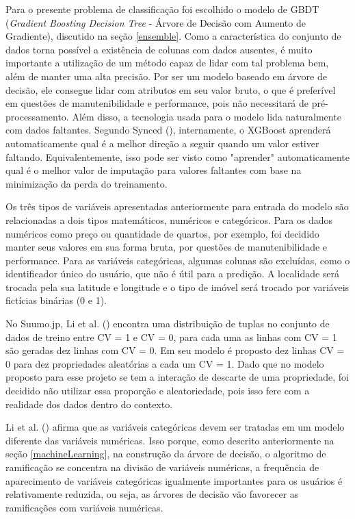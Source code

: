 Para o presente problema de classificação foi escolhido o modelo de GBDT (\textit{Gradient Boosting Decision Tree} - Árvore de Decisão com Aumento de Gradiente), discutido na seção \ref{ensemble}. Como a característica do conjunto de dados torna possível a existência de colunas com dados ausentes, é muito importante a utilização de um método capaz de lidar com tal problema bem, além de manter uma alta precisão. Por ser um modelo baseado em árvore de decisão, ele consegue lidar com atributos em seu valor bruto, o que é preferível em questões de manutenibilidade e performance, pois não necessitará de pré-processamento. Além disso, a tecnologia usada para o modelo lida naturalmente com dados faltantes. Segundo Synced (\citeyear{Synced:2017}), internamente, o XGBoost aprenderá automaticamente qual é a melhor direção a seguir quando um valor estiver faltando. Equivalentemente, isso pode ser visto como "aprender" automaticamente qual é o melhor valor de imputação para valores faltantes com base na minimização da perda do treinamento.

Os três tipos de variáveis apresentadas anteriormente para entrada do modelo são relacionadas a dois tipos matemáticos, numéricos e categóricos. Para os dados numéricos como preço ou quantidade de quartos, por exemplo, foi decidido manter seus valores em sua forma bruta, por questões de manutenibilidade e performance. Para as variáveis categóricas, algumas colunas são excluídas, como o identificador único do usuário, que não é útil para a predição. A localidade será trocada pela sua latitude e longitude e o tipo de imóvel será trocado por variáveis fictícias binárias (0 e 1).

No Suumo.jp, Li et al. (\citeyear{Summo:2017}) encontra uma distribuição de tuplas no conjunto de dados de treino entre CV = 1 e CV = 0, para cada uma as linhas com CV = 1 são geradas dez linhas com CV = 0. Em seu modelo é proposto dez linhas CV = 0 para dez propriedades aleatórias a cada um CV = 1. Dado que no modelo proposto para esse projeto se tem a interação de descarte de uma propriedade, foi decidido não utilizar essa proporção e aleatoriedade, pois isso fere com a realidade dos dados dentro do contexto.

Li et al. (\citeyear{Summo:2017}) afirma que as variáveis categóricas devem ser tratadas em um modelo diferente das variáveis numéricas. Isso porque, como descrito anteriormente na seção \ref{machineLearning}, na construção da árvore de decisão, o algoritmo de ramificação se concentra na divisão de variáveis numéricas, a frequência de aparecimento de variáveis categóricas igualmente importantes para os usuários é relativamente reduzida, ou seja, as árvores de decisão vão favorecer as ramificações com variáveis numéricas.

